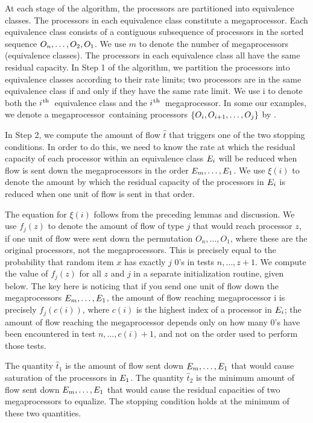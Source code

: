 \documentclass{article}
\newcounter{ass}
\newcommand{\ens}[1]{\ensuremath{#1}}					\newcommand{\card}[1]{\ens{|#1|}}							\newcommand{\dotlist}[2]{\ens{#1,\ldots,#2}}
\newcommand{\ith}{\ens{i^{\mbox{\hspace{.2mm}\scriptsize th}}}}
\newcommand{\processor}{processor}
\newcommand{\megaprocessor}{mega\processor}
\begin{document}
At each stage of the algorithm, the {\processor}s are partitioned into
equivalence classes.  The {\processor}s in each equivalence class constitute
a {\megaprocessor}.  Each equivalence class consists of a contiguous subsequence
of {\processor}s in the sorted sequence $\op n, \ldots, \op 2, \op 1$.
We use $m$ to denote the number of {\megaprocessor}s (equivalence classes).
The {\processor}s in each equivalence class all have the same
residual capacity.
In Step 1 of the algorithm, we partition the {\processor}s into
equivalence classes according
to their rate limits;  two processors are in the same equivalence
class if and only if they have the same rate limit.
We use \megaop i to denote both the \ith\ equivalence class and the \ith\ \megaprocessor. 
In some our examples, we denote a \megaprocessor\ containing \processor s $\{\op i, \op{i+1}, \ldots, \op{j}\}$ by . 

In Step 2, we compute the amount of flow $\hat{t}$ that 
triggers one of the two stopping conditions.
In order to do this, we need to know the rate at which
the residual capacity of each {\processor} within an equivalence
class $\megaop i$
will be reduced when flow is sent 
down the {\megaprocessor}s in the order $\megaop m, \ldots, \megaop 1$.
We use $\xi(i)$ to denote the amount by which the residual capacity
of the {\processor}s in $\megaop i$ is reduced when
one unit of flow is sent in that order.

The equation for $\xi(i)$ follows from the preceding lemmas and discussion.
We use $f_j(z)$ to denote the amount of flow of type $j$
that would reach {\processor} $z$, if one unit of flow were
sent down the permutation $O_n, \ldots, O_1$, where these
are the original {\processor}s, not the {\megaprocessor}s. 
This is precisely equal to the probability that random item $x$ has exactly
 $j$ 0's in tests $n, \ldots, z+1$.
We compute the value of $f_j(z)$ for all $z$ and $j$ in
a separate initialization routine, given below.
The key here is noticing that if you send one unit of flow
down the {\megaprocessor}s $\megaop m, \ldots, \megaop 1$,
the amount of flow reaching {\megaprocessor} \megaop i is precisely
$f_j(c(i))$, where $c(i)$ is the highest index of a {\processor} in $\megaop i$;
the amount of flow reaching the {\megaprocessor} depends only on how
many 0's have been encountered in test $n, \ldots, c(i)+1$,
and not on the order used to perform those tests.


The quantity $\hat{t}_1$ is the amount of flow sent down
$\megaop m, \ldots, \megaop 1$ that would cause saturation of the {\processor}s in $\megaop 1$.
The quantity $\hat{t}_2$ is the minimum amount of flow sent down
$\megaop m, \ldots, \megaop 1$ that would cause the residual capacities of two
{\megaprocessor}s to equalize.  The stopping condition holds at the
minimum of these two quantities.
\end{document}
